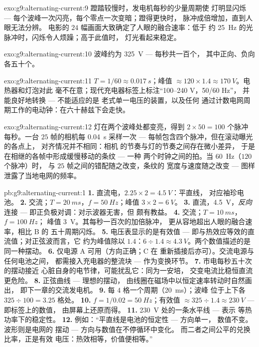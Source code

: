 \begin{solution}{exo:g9:alternating-current:9}
蹬踏较慢时，发电机每秒的少量周期使
灯明显闪烁 --- 每个波峰一次闪亮，每个零点一次变暗；蹬得更快时，
脉冲成倍增加，直到人眼无法分辨。
电影的 $24$ 幅画面大致确定了人眼的融合速率：低于
约 \qty{25}{Hz} 的光脉冲时，闪烁令人烦躁；高于此值时，
灯光看起来稳定。
\end{solution}

\begin{solution}{exo:g9:alternating-current:10}
波峰约为 \qty{325}{V} --- 每秒共一百个，
其中正向、负向各五十个。
\end{solution}

\begin{solution}{exo:g9:alternating-current:11}
$T = 1/60 \approx \qty{0.017}{s}$；峰值 $\approx 120 \times
1.4 \approx \qty{170}{V}$。电热器和灯泡对此
毫不在意；现代充电器标签上标注“100--240 V，50/60 Hz”，
并能良好地转换 --- 不能适应的是
老式单一电压的装置，以及任何
通过计数电网周期工作的电动钟：在六十赫兹下会走快。
\end{solution}

\begin{solution}{exo:g9:alternating-current:12}
灯在两个波峰处都变亮，得到 $2 \times 50 = 100$ 个脉冲
每秒。一台 $25$ 帧的相机每
\qty{0.04}{s} 采样一次 --- 每帧包含四个脉冲，但在滚动曝光的各点上，
对齐情况并不相同：相机
的节奏与灯的节奏之间存在微小差异，
于是在相继的各帧中形成缓慢移动的条纹 --- 一种
两个时钟之间的拍。当 \qty{60}{Hz}（$120$ 个脉冲）时，
与 $25$ 帧之间的错配随之改变，条纹的
宽度与速度随之改变 --- 图样泄露了当地电网的频率。
\end{solution}

\begin{solution}{pb:g9:alternating-current:1}
\textbf{1.} 直流电，$2.25 \times 2 = \qty{4.5}{V}$：平直线，
对应袖珍电池。
\textbf{2.} 交流；$T = \qty{20}{ms}$，$f = \qty{50}{Hz}$；峰值
$3 \times 2 = \qty{6}{V}$。
\textbf{3.} 直流，\qty{4.5}{V}，\emph{反向}连接 ---
即正负极对调：对示波器无害，但
颇有教益。
\textbf{4.} 交流；$T = \qty{10}{ms}$，$f = \qty{100}{Hz}$；
峰值 \qty{3}{V}。其每秒一百次的加倍脉冲，
更从容地超出人眼的融合速率，相比 B 的
五十周期闪烁。
\textbf{5.} 电压表显示的是有效值 ---
即与热效应等效的直流值；对正弦波而言，它
约为峰值除以 $1.4$：$6 \div 1.4 \approx
\qty{4.3}{V}$。两个数值描述的是同一种摆动。
\textbf{6.} 仅电源 A 可用（方向正确；C 在
重新插接后亦可）。交流电源与任何电池之间，
都需接入充电器的整流块 ---
作为变换环节。
\textbf{7.} 市电每秒五十次的摆动接近
心脏自身的电节律，可能扰乱它：同为一安培，
交变电流比稳恒直流更危险。
\textbf{8.} 正弦曲线 --- 理想的摆动，
由线圈在磁场中以恒定速率转动时自然画出，
即下一章的交流发电机。
\textbf{9.} 每 $4$ 格一个周期（\qty{20}{ms}）；波峰
位于上下各 $325 \div 100 = 3.25$ 格处。
\textbf{10.} $f = 1/0.02 = \qty{50}{Hz}$；有效值 $\approx
325 \div 1.4 \approx \qty{230}{V}$ --- 即标签上的数值，
由屏幕上还原而得。
\textbf{11.} \qty{230}{V} 处的一条水平线 --- 表示
等热功率下的稳定性。
\textbf{12.} 例如：“平直线是电池的恒定性 --- 方向单一，
数值不变。波形则是电网的
摆动 --- 方向与数值在不停循环中变化。
而二者之间公平的兑换比率，正是有效
电压：热效相等，价值便相等。”
\end{solution}
